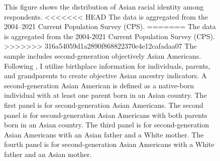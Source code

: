 \begin{landscape}
\begin{figure}[!htb]
\caption*{\footnotesize{This figure shows the distribution of Asian racial identity among respondents. 
<<<<<<< HEAD
The data is aggregated from the 2004--2021 Current Population Survey (CPS). 
=======
The data is aggregated from the 2004-2021 Current Population Survey (CPS). 
>>>>>>> 316a54059d1a2890f868822370e4e12cafadaa07
The sample includes second-generation objectively Asian Americans.
Following \textcite{antmanEthnicAttritionObserved2016,antmanEthnicAttritionAssimilation2020}, 
I utilize birthplace information for individuals, parents, and grandparents to create objective Asian ancestry indicators.
A second-generation Asian American is defined as a native-born individual with at least one parent born in an Asian country. 
The first panel is for second-generation Asian Americans. The second panel is for second-generation Asian Americans with both parents born in an Asian country. 
The third panel is for second-generation Asian Americans with an Asian father and a White mother. 
The fourth panel is for second-generation Asian Americans with a White father and an Asian mother.
}}
\end{figure}
\end{landscape}

\pagebreak
\newpage

\pagebreak
\newpage

